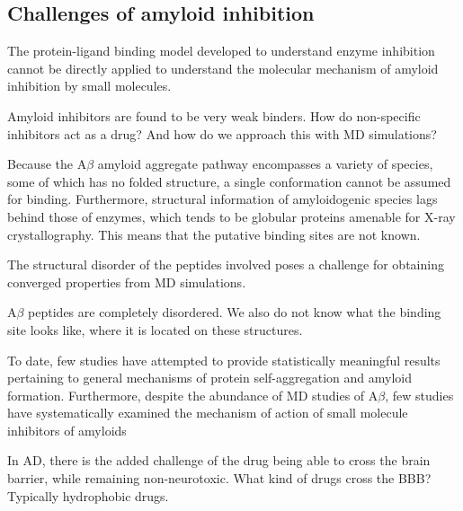 \subsection{Challenges of amyloid inhibition}
\begin{outline}


    \1 The protein-ligand binding model developed to understand enzyme inhibition cannot be directly applied to understand the molecular mechanism of amyloid inhibition by small molecules. 
    
      \2 Amyloid inhibitors are found to be very weak binders. How do non-specific inhibitors act as a drug? And how do we approach this with MD simulations?
      
      \2  Because the A$\beta$ amyloid aggregate pathway encompasses a variety of species, some of which has no folded structure, a single conformation cannot be assumed for binding. Furthermore, structural information of amyloidogenic species lags behind those of enzymes, which tends to be globular proteins amenable for X-ray crystallography. This means that the putative binding sites are not known.
      
      \2 The structural disorder of the peptides involved poses a challenge for obtaining converged properties from MD simulations. 
    
    	\1 A$\beta$ peptides are completely disordered.  We also do not know what the binding site looks like, where it is located on these structures.
    	
    \1 To date, few studies have attempted to provide statistically meaningful results pertaining to general mechanisms of protein self-aggregation and amyloid formation. Furthermore, despite the abundance of MD studies of A$\beta$, few studies have systematically examined the mechanism of action of small molecule inhibitors of amyloids

    \1 In AD, there is the added challenge of the drug being able to cross the brain barrier, while remaining non-neurotoxic.  What kind of drugs cross the BBB?  Typically hydrophobic drugs.
\end{outline}    

